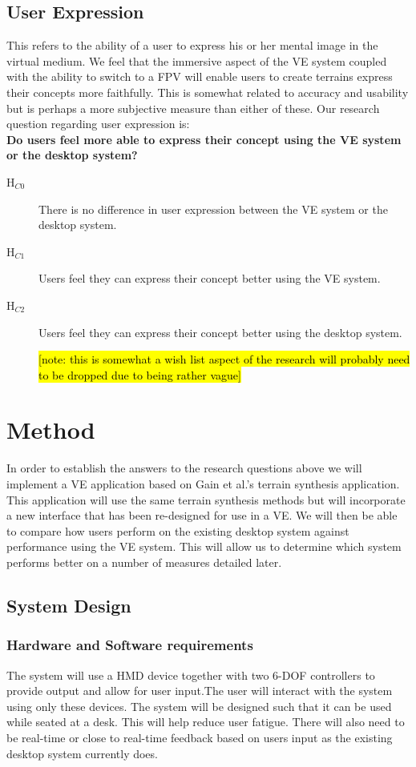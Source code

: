 \documentclass{sig-alternate-05-2015}
\begin{document}
\subsection{User Expression}
This refers to the ability of a user to express his or her mental image in the virtual medium. We feel that the immersive aspect of the VE system coupled with the ability to switch to a FPV will enable users to create terrains express their concepts more faithfully. This is somewhat related to accuracy and usability but is perhaps a more subjective measure than either of these. Our research question regarding user expression is: \\
\textbf{Do users feel more able to express their concept using the VE system or the desktop system?}\\
\begin{description}
	\item [H$_{C0}$] There is no difference in user expression between the VE system or the desktop system.
	\item [H$_{C1}$] Users feel they can express their concept better using the VE system.
	\item [H$_{C2}$] Users feel they can express their concept better using the desktop system.
	
\hl{[note: this is somewhat a wish list aspect of the research will probably need to be dropped due to being rather vague]}
\end{description}
\section{Method}
In order to establish the answers to the research questions above we will implement a VE application based on Gain et al.'s terrain synthesis application\cite{Gain2015}. This application will use the same terrain synthesis methods but will incorporate a new interface that has been re-designed for use in a VE. We will then be able to compare how users perform on the existing desktop system against performance using the VE system. This will allow us to determine which system performs better on a number of measures detailed later.
\subsection{System Design}
\subsubsection{Hardware and Software requirements}
The system will use a HMD device together with two 6-DOF controllers to provide output and allow for user input.The user will interact with the system using only these devices. The system will be designed such that it can be used while seated at a desk. This will help reduce user fatigue\cite{Schultheis2012}. There will also need to be real-time or close to real-time feedback based on users input as the existing desktop system currently does.
\end{document}
